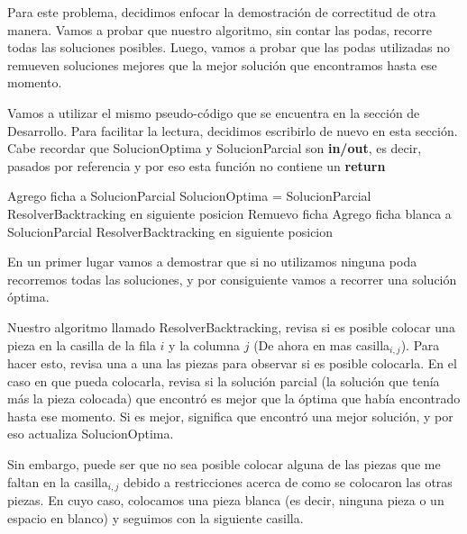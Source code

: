 Para este problema, decidimos enfocar la demostración de correctitud de otra manera. Vamos a probar que nuestro algoritmo, sin contar las podas, recorre todas las soluciones posibles. Luego, vamos a probar que las podas utilizadas no remueven soluciones mejores que la mejor solución que encontramos hasta ese momento.

Vamos a utilizar el mismo pseudo-código que se encuentra en la sección de Desarrollo. Para facilitar la lectura, decidimos escribirlo de nuevo en esta sección. Cabe recordar que SolucionOptima y SolucionParcial son \textbf{in/out}, es decir, pasados por referencia y por eso esta función no contiene un \textbf{return}

\begin{pseudo}

	    \State Agrego ficha a SolucionParcial
	      \State SolucionOptima = SolucionParcial
	    \EndIf
	     
	      \State ResolverBacktracking en siguiente posicion
	    \EndIf
	    \State Remuevo ficha 
	  \EndIf
	\EndFor
        \State Agrego ficha blanca a SolucionParcial
        \State ResolverBacktracking en siguiente posicion
    \EndProcedure
\end{pseudo}

En un primer lugar vamos a demostrar que si no utilizamos ninguna poda recorremos todas las soluciones, y por consiguiente vamos a recorrer una solución óptima.

Nuestro algoritmo llamado ResolverBacktracking, revisa si es posible colocar una pieza en la casilla de la fila $i$ y la columna $j$ (De ahora en mas casilla$_{i,j}$). Para hacer esto, revisa una a una las piezas para observar si es posible colocarla. En el caso en que pueda colocarla, revisa si la solución parcial (la solución que tenía más la pieza colocada) que encontró es mejor que la óptima que había encontrado hasta ese momento. Si es mejor, significa que encontró una mejor solución, y por eso actualiza SolucionOptima.

Sin embargo, puede ser que no sea posible colocar alguna de las piezas que me faltan en la casilla$_{i,j}$ debido a restricciones acerca de como se colocaron las otras piezas. En cuyo caso, colocamos una pieza blanca (es decir, ninguna pieza o un espacio en blanco) y seguimos con la siguiente casilla.

